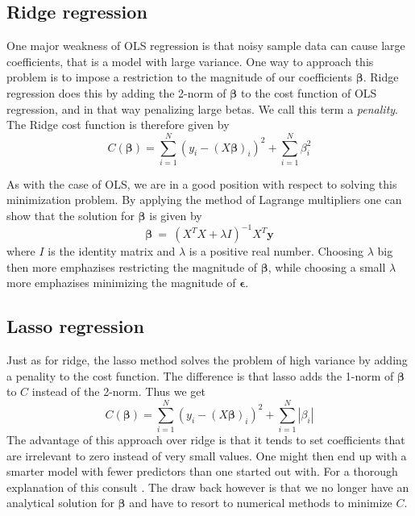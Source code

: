 \documentclass[a4paper,norsk]{article}
\begin{document}
\subsection{Ridge regression}
One major weakness of OLS regression is that noisy sample data can cause
large coefficients, that is a model with large variance. One way
to approach this problem is to impose a restriction to the magnitude of 
our coefficients $\bm{\beta}$. Ridge regression does this by adding the 
2-norm of $\bm{\beta}$ to the cost function of OLS regression, and in 
that way penalizing large betas. We call this term a \textit{penality}.
The Ridge cost function is therefore given by
\begin{equation}
    C(\bm{\beta}) = \sum_{i=1}^N (y_i - (X\bm{\beta})_i)^2 + 
    \sum_{i=1}^N \beta_i^2
\end{equation}
\par
As with the case of OLS, we are in a good position with respect to solving
this minimization problem. By applying the method of Lagrange multipliers
one can show that the solution for $\bm{\beta}$ is given by
\begin{equation}
    \bm{\beta} \ = \ (X^TX + \lambda I)^{-1}X^T\bm{y}
\end{equation}
where $I$ is the identity matrix and $\lambda$ is a positive real number.
Choosing $\lambda$ big then more emphazises restricting the magnitude of 
$\bm{\beta}$, while choosing a small $\lambda$ more emphazises
minimizing the magnitude of $\bm{\epsilon}$.

\subsection{Lasso regression}
Just as for ridge, the lasso method solves the problem of high variance 
by adding a penality to the cost function. The difference is that 
lasso adds the 1-norm of $\bm{\beta}$ to $C$ instead of the 2-norm. 
Thus we get
\begin{equation}
    C(\bm{\beta}) = \sum_{i=1}^N (y_i - (X\bm{\beta})_i)^2 + 
    \sum_{i=1}^N |\beta_i|
\end{equation}
The advantage of this approach over ridge 
is that it tends to set coefficients that are irrelevant to zero instead
of very small values. One might then end up with a smarter model with 
fewer predictors than one started out with. For a thorough explanation 
of this consult \cite{lasso}. 
The draw back however is that we no longer have an analytical solution for
$\bm{\beta}$ and have to resort to numerical methods to minimize $C$. 
\end{document}
